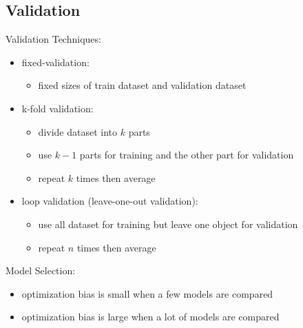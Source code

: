 \documentclass[10pt,landscape,a4paper]{article}
\begin{document}
\tiny
\begin{multicols*}{5}
\section{Validation}

Validation Techniques:
\begin{itemize}
    \item fixed-validation:
    \begin{itemize}
        \item fixed sizes of train dataset and validation dataset
    \end{itemize}
    \item k-fold validation:
    \begin{itemize}
        \item divide dataset into \(k\) parts
        \item use \(k-1\) parts for training and the other part for validation
        \item repeat \(k\) times then average
    \end{itemize}
    \item loop validation (leave-one-out validation):
    \begin{itemize}
        \item use all dataset for training but leave one object for validation
        \item repeat \(n\) times then average
    \end{itemize}
\end{itemize}
Model Selection:
\begin{itemize}
    \item optimization bias is small when a few models are compared
    \item optimization bias is large when a lot of models are compared
\end{itemize}



\end{multicols*}
\end{document}
